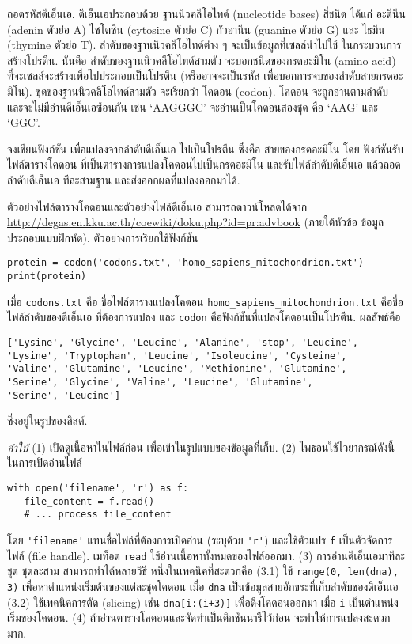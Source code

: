 \begin{Exercise}
	\label{prog file codon}
    ถอดรหัสดีเอ็นเอ.
	ดีเอ็นเอประกอบด้วย ฐานนิวคลีโอไทด์ (nucleotide bases) สี่ชนิด ได้แก่ 
	อะดีนีน (adenin ตัวย่อ A) 
	ไซโตซีน (cytosine ตัวย่อ C)
	กัวอานีน (guanine ตัวย่อ G)
	และ ไธมีน (thymine ตัวย่อ T).
	ลำดับของฐานนิวคลีโอไทด์ต่าง ๆ จะเป็นข้อมูลที่เซลล์นำไปใช้ ในกระบวนการสร้างโปรตีน.
	นั่นคือ ลำดับของฐานนิวคลีโอไทด์สามตัว จะบอกชนิดของกรดอะมิโน (amino acid) ที่จะเซลล์จะสร้างเพื่อไปประกอบเป็นโปรตีน (หรืออาจจะเป็นรหัส เพื่อบอกการจบของลำดับสายกรดอะมิโน).
	ชุดของฐานนิวคลีโอไทด์สามตัว จะเรียกว่า โคดอน (codon).
	โคดอน จะถูกอ่านตามลำดับ และจะไม่มีอ่านดีเอ็นเอซ้อนกัน เช่น `AAGGGC' จะอ่านเป็นโคดอนสองชุด คือ  `AAG' และ `GGC'.
	
	จงเขียนฟังก์ชัน เพื่อแปลงจากลำดับดีเอ็นเอ ไปเป็นโปรตีน ซึ่งคือ สายของกรดอะมิโน
	โดย
	ฟังก์ชันรับไฟล์ตารางโคดอน ที่เป็นตารางการแปลงโคดอนไปเป็นกรดอะมิโน
	และรับไฟล์ลำดับดีเอ็นเอ
	แล้วถอดลำดับดีเอ็นเอ ทีละสามฐาน และส่งออกผลที่แปลงออกมาได้.
	
ตัวอย่างไฟล์ตารางโคดอนและตัวอย่างไฟล์ดีเอ็นเอ สามารถดาวน์โหลดได้จาก \url{http://degas.en.kku.ac.th/coewiki/doku.php?id=pr:advbook} (ภายใต้หัวข้อ ข้อมูลประกอบแบบฝึกหัด).
ตัวอย่างการเรียกใช้ฟังก์ชัน
\begin{verbatim}
protein = codon('codons.txt', 'homo_sapiens_mitochondrion.txt')
print(protein)
\end{verbatim}
เมื่อ \verb|codons.txt| คือ ชื่อไฟล์ตารางแปลงโคดอน
\verb|homo_sapiens_mitochondrion.txt| คือชื่อไฟล์ลำดับของดีเอ็นเอ ที่ต้องการแปลง
และ \verb|codon| คือฟังก์ชันที่แปลงโคดอนเป็นโปรตีน.
ผลลัพธ์คือ
\begin{verbatim}
['Lysine', 'Glycine', 'Leucine', 'Alanine', 'stop', 'Leucine', 
'Lysine', 'Tryptophan', 'Leucine', 'Isoleucine', 'Cysteine', 
'Valine', 'Glutamine', 'Leucine', 'Methionine', 'Glutamine', 
'Serine', 'Glycine', 'Valine', 'Leucine', 'Glutamine', 
'Serine', 'Leucine']
\end{verbatim}
ซึ่งอยู่ในรูปของลิสต์.

\textit{คำใบ้}
(1) เปิดดูเนื้อหาในไฟล์ก่อน เพื่อเข้าในรูปแบบของข้อมูลที่เก็บ.
(2) ไพธอนใช้ไวยากรณ์ดังนี้ในการเปิดอ่านไฟล์
\begin{verbatim}
with open('filename', 'r') as f:
   file_content = f.read()
   # ... process file_content
\end{verbatim}
โดย \verb|'filename'| แทนชื่อไฟล์ที่ต้องการเปิดอ่าน (ระบุด้วย \verb|'r'|)
และใช้ตัวแปร \verb|f| เป็นตัวจัดการไฟล์ (file handle).
เมท็อด \verb|read| ใช้อ่านเนื้อหาทั้งหมดของไฟล์ออกมา.
(3) การอ่านดีเอ็นเอมาทีละชุด ชุดละสาม สามารถทำได้หลายวิธี หนึ่งในเทคนิคที่สะดวกคือ
(3.1) ใช้ \verb|range(0, len(dna), 3)| เพื่อหาตำแหน่งเริ่มต้นของแต่ละชุดโคดอน เมื่อ \verb|dna| เป็นข้อมูลสายอักขระที่เก็บลำดับของดีเอ็นเอ
(3.2) ใช้เทคนิคการตัด (slicing) เช่น \verb|dna[i:(i+3)]| เพื่อดึงโคดอนออกมา เมื่อ \verb|i| เป็นตำแหน่งเริ่มของโคดอน.
(4) ถ้าอ่านตารางโคดอนและจัดทำเป็นดิกชันนารีไว้ก่อน จะทำให้การแปลงสะดวกมาก.

\end{Exercise}

